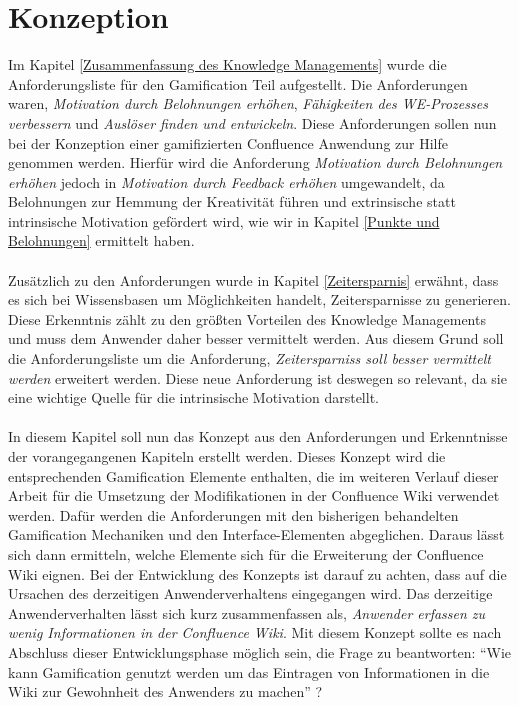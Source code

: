 \documentclass[a4paper,12pt]{scrartcl}
\begin{document}
\section{Konzeption}
\label{Konzeption}
Im Kapitel \ref{Zusammenfassung des Knowledge Managements} wurde die Anforderungsliste für den Gamification Teil aufgestellt. Die Anforderungen waren, \textit{Motivation durch Belohnungen erhöhen}, \textit{Fähigkeiten des WE-Prozesses verbessern} und \textit{Auslöser finden und entwickeln}. Diese Anforderungen sollen nun bei der Konzeption einer gamifizierten Confluence Anwendung zur Hilfe genommen werden. Hierfür wird die Anforderung \textit{Motivation durch Belohnungen erhöhen} jedoch in \textit{Motivation durch Feedback erhöhen} umgewandelt, da Belohnungen zur Hemmung der Kreativität führen und extrinsische statt intrinsische Motivation gefördert wird, wie wir in Kapitel \ref{Punkte und Belohnungen} ermittelt haben. 
\\\\
Zusätzlich zu den Anforderungen wurde in Kapitel \ref{Zeitersparnis} erwähnt, dass es sich bei Wissensbasen um Möglichkeiten handelt, Zeitersparnisse zu generieren. Diese Erkenntnis zählt zu den größten Vorteilen des Knowledge Managements und muss dem Anwender daher besser vermittelt werden. Aus diesem Grund soll die Anforderungsliste um die Anforderung, \textit{Zeitersparniss soll besser vermittelt werden} erweitert werden. Diese neue Anforderung ist deswegen so relevant, da sie eine wichtige Quelle für die intrinsische Motivation darstellt.
\\\\
In diesem Kapitel soll nun das Konzept aus den Anforderungen und Erkenntnisse der vorangegangenen Kapiteln erstellt werden. Dieses Konzept wird die entsprechenden Gamification Elemente enthalten, die im weiteren Verlauf dieser Arbeit für die Umsetzung der Modifikationen in der Confluence Wiki verwendet werden. Dafür werden die Anforderungen mit den bisherigen behandelten Gamification Mechaniken und den Interface-Elementen abgeglichen. Daraus lässt sich dann ermitteln, welche Elemente sich für die Erweiterung der Confluence Wiki eignen. Bei der Entwicklung des Konzepts ist darauf zu achten, dass auf die Ursachen des derzeitigen Anwenderverhaltens eingegangen wird. Das derzeitige Anwenderverhalten lässt sich kurz zusammenfassen als, \textit{Anwender erfassen zu wenig Informationen in der Confluence Wiki}. Mit diesem Konzept sollte es nach Abschluss dieser Entwicklungsphase möglich sein, die Frage zu beantworten: \enquote{Wie kann Gamification genutzt werden um das Eintragen von Informationen in die Wiki zur Gewohnheit des Anwenders zu machen} ?
\end{document}
